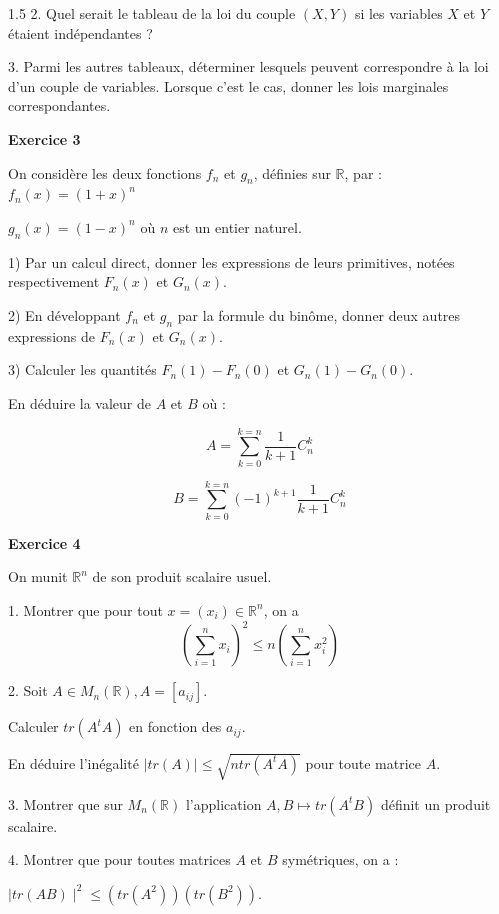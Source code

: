 \documentclass[12pt]{article}
\begin{document}
\begin{spacing}{1.5}
2. Quel serait le tableau de la loi du couple $(X,Y)$ si les variables $X$ et $Y$ étaient
 indépendantes ?

3. Parmi les autres tableaux, déterminer lesquels peuvent correspondre à la loi d'un couple de variables. Lorsque c'est le cas, donner les lois marginales correspondantes.

\medskip\textbf{Exercice 3}

On considère les deux fonctions $f_n$ et $g_n$, définies sur $\mathbb{R}$, par : 
$f_n(x) = (1 + x)^n$ 

$g_n(x) = (1 - x)^n$ où $n$ est un entier naturel. 

1) Par un calcul direct, donner les expressions de leurs primitives, notées respectivement $F_n(x)$ 
et $G_n(x)$.  

2) En développant $f_n$ et $g_n$ par la formule du binôme, donner deux autres expressions de $F_n(x)$ et $G_n(x)$. 

3) Calculer les quantités $F_n(1)-F_n(0)$ et $G_n(1) - G_n(0)$. 

En déduire la valeur de $A$ et $B$ où : 

\[
A = \sum_{k=0}^{k=n}\frac{1}{k+1}C_{n}^{k}
\]

\[
B=\sum_{k=0}^{k=n}(-1)^{k+1}\frac{1}{k+1}C_{n}^{k}
\]

\medskip\textbf{Exercice 4}

 On munit $\mathbb{R}^n$ de son produit scalaire usuel.
 
 1. Montrer que pour tout $x = (x_i) \in \mathbb{R}^n$, on a
 \[
 (\sum_{i=1}^{n} x_i)^2\leq n(\sum_{i=1}^{n} x_{i}^{2})
 \]
 
 2.  Soit $A \in M_{n}(\mathbb{R}), A = [a_{ij}]$.
 
 Calculer $tr(A^tA)$ en fonction des $a_{ij}$.
 
 En déduire l'inégalité $\mid tr(A)\mid \leq \sqrt{ntr(A^tA)}$ pour toute matrice $A$.
 
 3. Montrer que sur $M_n(\mathbb{R})$ l'application $A,B \longmapsto tr(A^tB)$ définit un produit scalaire.
 
4. Montrer que pour toutes matrices $A$ et $B$ symétriques, on a :
 
 $\mid tr(AB)\mid^2 \leq  (tr(A^2))(tr(B^2))$.
 
 \quad
 

\end{spacing}
\end{document}
